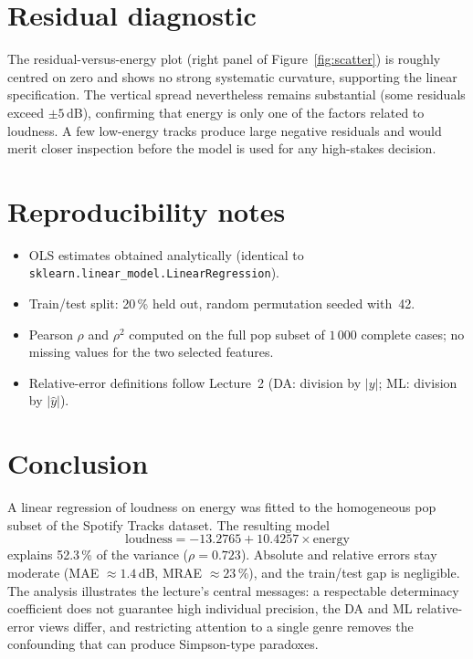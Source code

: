 \documentclass[11pt,a4paper]{article}
\begin{document}
\section{Residual diagnostic}

The residual-versus-energy plot (right panel of Figure~\ref{fig:scatter}) is
roughly centred on zero and shows no strong systematic curvature, supporting
the linear specification. The vertical spread nevertheless remains substantial
(some residuals exceed $\pm5$\,dB), confirming that energy is only one of the
factors related to loudness. A few low-energy tracks produce large negative
residuals and would merit closer inspection before the model is used for any
high-stakes decision.

\section{Reproducibility notes}

\begin{itemize}
  \item OLS estimates obtained analytically (identical to
        \texttt{sklearn.linear\_model.LinearRegression}).
  \item Train/test split: 20\,\% held out, random permutation seeded with~42.
  \item Pearson $\rho$ and $\rho^2$ computed on the full pop subset of
        $1\,000$ complete cases; no missing values for the two selected features.
  \item Relative-error definitions follow Lecture~2
        (DA: division by $|y|$; ML: division by $|\hat{y}|$).
\end{itemize}

\section{Conclusion}

A linear regression of loudness on energy was fitted to the homogeneous pop
subset of the Spotify Tracks dataset. The resulting model
\[
  \mathrm{loudness} = -13.2765 + 10.4257 \times \mathrm{energy}
\]
explains 52.3\,\% of the variance ($\rho = 0.723$). Absolute and relative
errors stay moderate (MAE $\approx 1.4$\,dB, MRAE $\approx 23\,\%$), and the
train/test gap is negligible. The analysis illustrates the lecture's central
messages: a respectable determinacy coefficient does not guarantee high
individual precision, the DA and ML relative-error views differ, and restricting
attention to a single genre removes the confounding that can produce
Simpson-type paradoxes.
\end{document}
